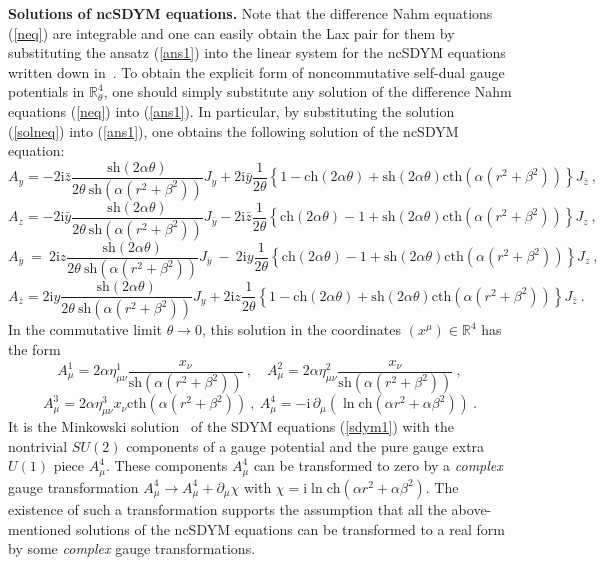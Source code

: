 \documentclass[a4paper,11pt]{article}
\numberwithin{equation}{section}
\def\th{\theta}
\def\a{\alpha}
\def\b{\beta}
\def\m{\mu}
\def\n{\nu}
\def\pa{\partial}
\newcommand{\im}{\mathrm{i}}
\newcommand{\sh}{\mathrm{sh}}
\newcommand{\ch}{\mathrm{ch}}
\newcommand{\cth}{\mathrm{cth}}
\newcommand{\rc}{{\mathbb{R}^4}}
\newcommand{\rct}{{\mathbb{R}^4_\theta}}
\begin{document}
{\bf Solutions of ncSDYM equations.} 
Note that  the difference Nahm equations (\ref{neq}) are integrable
and one can easily obtain the  Lax pair for them by substituting
the ansatz (\ref{ans1}) into the linear system for the ncSDYM equations
written down in~\cite{LP1}.
To obtain the explicit form of noncommutative self-dual gauge potentials in 
$\rct$, one should simply substitute any solution of the difference Nahm
equations (\ref{neq}) into (\ref{ans1}). In particular, by substituting the solution 
(\ref{solneq}) into (\ref{ans1}), one obtains the following solution
of the ncSDYM equation:
$$A_y = - 2\im\bar z \frac{\sh(2\a\th )}{2\th\ \sh(\a (r^2 + \b^2) )}J_y+
 2\im \bar y  \frac{1}{2\th }\left\{1 - \ch(2\a\th ) + \sh(2\a\th )
\cth(\a (r^2 +\b^2 ))\right \}J_{\bar z} \ , 
$$
$$
A_z = - 2\im \bar y \frac{\sh(2\a\th )}{2\th\ \sh(\a (r^2 +\b^2 ))} J_{\bar y}-
 2\im \bar z \frac{1}{2\th }\left\{\ch (2\a\th)-1 +  \sh(2\a\th )
\cth(\a (r^2 +\b^2 ))\right \}J_z     \ , 
$$
$$
A_{\bar y}\  = \  2\im z \frac{\sh(2\a\th )}{2\th\ \sh(\a (r^2 +\b^2 ))} J_{\bar y}\ -\
 2\im  y \frac{1}{2\th }\left\{\ch (2\a\th)-1 +  \sh(2\a\th )
\cth(\a (r^2 +\b^2 ))\right \}J_z \ ,
$$
\begin{equation}
A_{\bar z} = 2\im  y\frac{\sh(2\a\th )}{2\th\ \sh(\a (r^2 + \b^2) )}J_y 
 + 2\im  z \frac{1}{2\th }\left\{1 - \ch(2\a\th ) + \sh(2\a\th )
\cth(\a (r^2 +\b^2 ))\right \}J_{\bar z}\ . \label{nc1}
\end{equation}
In the commutative limit $\th\to 0$, this solution in the coordinates
$(x^\m)\in\rc$ has the form
$$
A_\m^1=2\a\eta^1_{\m\n}\frac{x_\n}{\sh (\a (r^2 + \b^2 ))}\ ,\quad
A_\m^2=2\a\eta^2_{\m\n}\frac{x_\n}{\sh (\a (r^2 + \b^2 ))}\ ,
$$
\begin{equation}\label{pop}
A_\m^3=2\a\eta^3_{\m\n}{x_\n}{\cth(\a (r^2 + \b^2 ))}\ , \
A_\m^4=-\im \, \pa_\m (\ln\ch (\a r^2+\a\b^2))\ .
\end{equation}
 It is the Minkowski solution~\cite{Mink}
of the SDYM equations (\ref{sdym1}) with the nontrivial $SU(2)$ 
components of a gauge potential and the pure gauge extra $U(1)$ piece $A_\m^4$.
These components $A_\m^4$ can be transformed to zero by a {\it complex} gauge 
transformation $A_\m^4\to A_\m^4 + \pa_\m\chi$ with $\chi =\im\ln\ch (\a r^2+\a\b^2)$.
The existence of such a transformation supports the assumption that all 
the above-mentioned solutions of the ncSDYM equations can be transformed to a 
real form by some {\it complex} gauge transformations.
\end{document}

